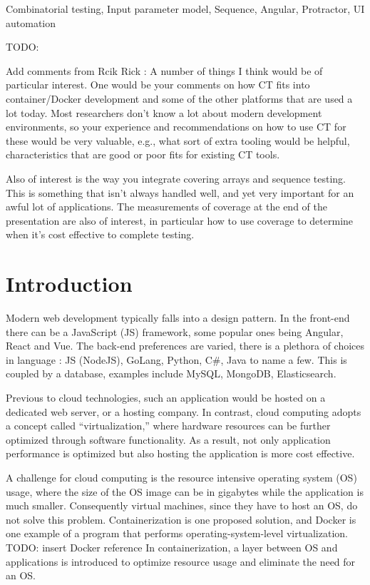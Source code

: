 \documentclass[conference]{IEEEtran}
\newcommand{\todo}[1]{}
\renewcommand{\todo}[1]{{\color{red} TODO: {#1}}}
\begin{document}
\begin{IEEEkeywords}
Combinatorial testing, Input parameter model, Sequence, Angular, Protractor, UI automation
\end{IEEEkeywords}



\todo{ Add comments from Rcik 
Rick : A number of things I think would be of particular interest. 
One would be your comments on how CT fits into container/Docker development and some of the other platforms that are used a lot today. 
Most researchers don’t know a lot about modern development environments, so your experience and recommendations on how to use CT for these would be very valuable, e.g., 
what sort of extra tooling would be helpful, characteristics that are good or poor fits for existing CT tools.

Also of interest is the way you integrate covering arrays and sequence testing.
This is something that isn’t always handled well, and yet very important for an awful lot of applications.
The measurements of coverage at the end of the presentation are also of interest,
in particular how to use coverage to determine when it’s cost effective to complete testing.
}


\section{Introduction}
Modern web development typically falls into a design pattern. In the front-end there can be a JavaScript (JS) framework, some popular ones being Angular, React and Vue.
The back-end preferences are varied, there is a plethora of choices in language : JS (NodeJS), GoLang, Python, C\#, Java to name a few. 
This is coupled by a database, examples include MySQL, MongoDB, Elasticsearch.

Previous to cloud technologies, such an application would be hosted on a dedicated web server, or a hosting company.
In contrast, cloud computing adopts a concept called “virtualization,” where hardware resources can be further optimized through software functionality.
As a result, not only application performance is optimized but also hosting the application is more cost effective.

A challenge for cloud computing is the resource intensive operating system (OS) usage, where the size of the OS image can be in gigabytes while the application is much smaller. 
Consequently virtual machines, since they have to host an OS, do not solve this problem.
Containerization is one proposed solution, and Docker is one example of a program that performs operating-system-level virtualization. 
\todo {insert Docker reference}
In containerization, a layer between OS and applications is introduced to optimize resource usage and eliminate the need for an OS.
\end{document}
